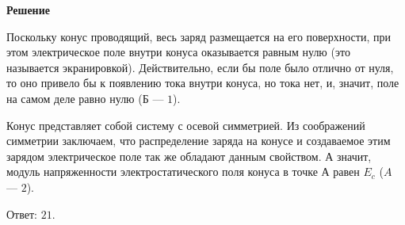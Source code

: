 \documentclass[12pt,a4paper]{article}
\begin{document}
{\begin{center}\end{center}
\par
}{
\smallskip\noindent\textbf{Решение}\par
Поскольку конус проводящий, весь заряд размещается на его поверхности, при этом электрическое поле внутри конуса оказывается равным нулю (это называется экранировкой). Действительно, если бы поле было отлично от нуля, то оно привело бы к появлению тока внутри конуса, но тока нет, и, значит, поле на самом деле равно нулю (Б — $1$).\par
Конус представляет собой систему с осевой симметрией. Из соображений симметрии заключаем, что распределение заряда на конусе и создаваемое этим зарядом электрическое поле так же обладают данным свойством. А значит, модуль напряженности электростатического поля конуса в точке А равен $E_{c}$ ($A$ — $2$).\par
Ответ: $21$.\par
}
\end{document}

